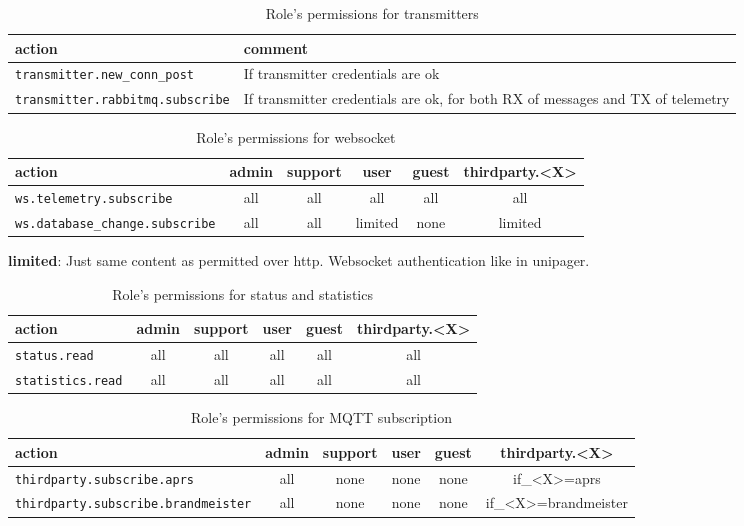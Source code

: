 \begin{table}[htbp]
\label{tab:protocoldef:permissionmatrix:transmitters}
  \begin{tabular}{|l|p{7cm}|} \hline
    action                                & comment \\ \hline \hline
    \verb|transmitter.new_conn_post|      & If transmitter credentials are ok\\ \hline
    \verb|transmitter.rabbitmq.subscribe| & If transmitter credentials are ok, for both RX of messages and TX of telemetry \\ \hline
  \end{tabular}
  \caption{Role's permissions for transmitters}
\end{table}



\begin{table}[htbp]
\label{tab:protocoldef:permissionmatrix:websocket}
  \begin{tabular}{|l|c|c|c|c|c|} \hline
    action                              & admin & support & user    & guest & thirdparty.<X> \\ \hline \hline
    \verb|ws.telemetry.subscribe|       & all   & all     & all     & all   & all    \\ \hline
    \verb|ws.database_change.subscribe| & all   & all     & limited & none  & limited \\ \hline
  \end{tabular}
  \caption{Role's permissions for websocket}
\textbf{limited}: Just same content as permitted over http. Websocket authentication like in unipager.
\end{table}

\begin{table}[htbp]
\label{tab:protocoldef:permissionmatrix:statusandstats}
  \begin{tabular}{|l|c|c|c|c|c|} \hline
    action                 & admin & support & user & guest & thirdparty.<X> \\ \hline \hline
    \verb|status.read|     & all   & all     & all  & all   & all    \\ \hline
    \verb|statistics.read| & all   & all     & all  & all   & all \\ \hline
  \end{tabular}
  \caption{Role's permissions for status and statistics}
\end{table}

\begin{table}[htbp]
\label{tab:protocoldef:permissionmatrix:mqtt}
  \begin{tabular}{|l|c|c|c|c|c|} \hline
    action                                   & admin & support & user & guest & thirdparty.<X> \\ \hline \hline
    \verb|thirdparty.subscribe.aprs|         & all   & none    & none  & none & if\_<X>=aprs         \\ \hline
    \verb|thirdparty.subscribe.brandmeister| & all   & none    & none  & none & if\_<X>=brandmeister \\ \hline
  \end{tabular}
  \caption{Role's permissions for MQTT subscription}
\end{table}

